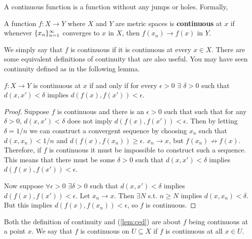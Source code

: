 A continuous function is a function without any jumps or
holes. Formally,
\begin{definition}
  A function $f:X \to Y$ where $X$ and $Y$ are metric spaces is
  \textbf{continuous} at $x$ if whenever $\{{x}_n \}_{n=1}^\infty$ converges to $x$ in
  $X$, then $f(x_n) \to f(x)$ in $Y$.  
\end{definition}
We simply say that $f$ is continuous if it is continuous at every
$x \in X$.  There are some equivalent definitions of continuity that
are also useful. You may have seen continuity defined as in the
following lemma.
\begin{lemma}\label{lem:ced}
  $f: X \to Y$ is continuous at $x$ if and only if for every
  $\epsilon>0$ $\exists$ $\delta >0$ such that $d(x,x') < \delta $
  implies $d(f(x),f(x')) < \epsilon$.
\end{lemma}
\begin{proof}
  Suppose $f$ is continuous and there is an $\epsilon>0$ such that
  such that for any $\delta>0$, $d(x,x') < \delta$ does not imply
  $d(f(x),f(x'))< \epsilon$. Then by letting $\delta = 1/n$ we can
  construct a convergent sequence by choosing $x_n$ such that
  $d(x,x_n) < 1/n$ and $d(f(x),f(x_n)) \geq \epsilon$. $x_n \to x$,
  but $f(x_n) \not\to f(x)$. Therefore, if $f$ is continuous it must
  be impossible to construct such a sequence. This means that there
  must be some $\delta>0$ such that $d(x,x') < \delta$ implies
  $d(f(x),f(x')) < \epsilon$.

  Now suppose $\forall \epsilon>0$ $\exists \delta>0$ such that
  $d(x,x')<\delta$ implies $d(f(x),f(x')) <\epsilon$. Let $x_n \to
  x$. Then $\exists N$ s.t. $n\geq N$ implies $d(x,x_n) < \delta$. But
  this implies $d(f(x),f(x_n)) < \epsilon$, so $f$ is continuous.
\end{proof}
Both the definition of continuity and (\ref{lem:ced}) are about $f$
being continuous at a point $x$. We say that $f$ is continuous on $U
\subseteq X$ if $f$ is continuous at all $x \in U$.

